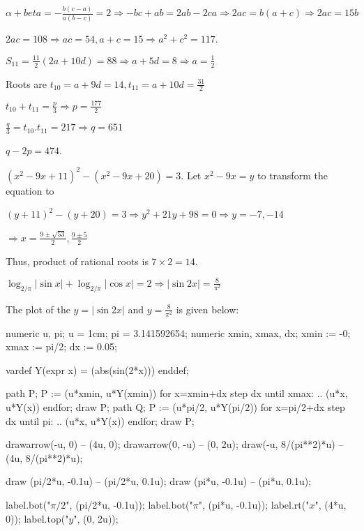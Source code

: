   $\alpha + beta = -\frac{b(c - a)}{a(b - c)} = 2\Rightarrow -bc + ab = 2ab - 2ca\Rightarrow 2ac = b(a +
  c)\Rightarrow 2ac = 15b$

  $2ac = 108 \Rightarrow ac = 54, a + c = 15\Rightarrow a^2 + c^2 = 117$.
\item $S_{11} = \frac{11}{2}(2a + 10d) = 88 \Rightarrow a + 5d = 8\Rightarrow a = \frac{1}{2}$

  Roots are $t_{10} = a + 9d = 14, t_{11} = a + 10d = \frac{31}{2}$

  $t_{10} + t_{11} = \frac{p}{3}\Rightarrow p = \frac{177}{2}$

  $\frac{q}{3} = t_{10}.t_{11} = 217 \Rightarrow q = 651$

  $q - 2p = 474$.
\item $\left(x^2 - 9x + 11\right)^2 - \left(x^2 - 9x + 20\right) = 3$. Let $x^2 - 9x = y$ to transform the
  equation to

  $(y + 11)^2 - (y + 20) = 3 \Rightarrow y^2 + 21y + 98 = 0 \Rightarrow y = -7, -14$

  $\Rightarrow x = \frac{9\pm\sqrt{53}}{2}, \frac{9\pm5}{2}$

  Thus, product of rational roots is $7\times 2 = 14$.
\item $\log_{2/\pi}|\sin x| + \log_{2/\pi}|\cos x| = 2\Rightarrow |\sin 2x| = \frac{8}{\pi^2}$

  The plot of the $y = |\sin 2x|$ and $y = \frac{8}{\pi^2}$ is given below:

  \startplacefigure[location=force]
    \startMPcode
      numeric u, pi;
      u = 1cm;
      pi = 3.141592654;
      numeric xmin, xmax, dx;
      xmin := -0; xmax := pi/2; dx := 0.05;

      vardef Y(expr x) = (abs(sin(2*x))) enddef;

      path P;
      P := (u*xmin, u*Y(xmin))
      for x=xmin+dx step dx until xmax:
      .. (u*x, u*Y(x))
      endfor;
      draw P;
      path Q;
      P := (u*pi/2, u*Y(pi/2))
      for x=pi/2+dx step dx until pi:
      .. (u*x, u*Y(x))
      endfor;
      draw P;

      drawarrow(-u, 0) -- (4u, 0);
      drawarrow(0, -u) -- (0, 2u);
      draw(-u, 8/(pi**2)*u) -- (4u, 8/(pi**2)*u);

      draw (pi/2*u, -0.1u) -- (pi/2*u, 0.1u);
      draw (pi*u, -0.1u) -- (pi*u, 0.1u);

      label.bot("$\pi/2$", (pi/2*u, -0.1u));
      label.bot("$\pi$", (pi*u, -0.1u));
      label.rt("$x$", (4*u, 0));
      label.top("$y$", (0, 2u));
    \stopMPcode
  \stopplacefigure

